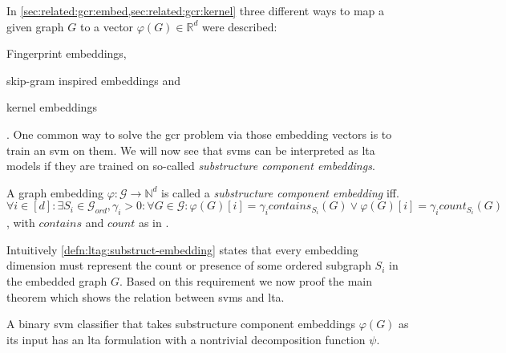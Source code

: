 In \cref{sec:related:gcr:embed,sec:related:gcr:kernel} three different ways to map a given graph $G$ to a vector $\varphi(G) \in \mathbb{R}^d$ were described:
\begin{enumerate*}
	\item Fingerprint embeddings,
	\item skip-gram inspired embeddings and
	\item kernel embeddings
\end{enumerate*}.
One common way to solve the \ac{gcr} problem via those embedding vectors is to train an \ac{svm} on them.
We will now see that \acp{svm} can be interpreted as \ac{lta} models if they are trained on so-called \textit{substructure component embeddings}.
\begin{defn}\label{defn:ltag:substruct-embedding}
	A graph embedding $\varphi: \mathcal{G} \to \mathbb{N}^{d}$ is called a \textit{substructure component embedding} iff.\ %
	$\forall i \in [d]: \exists S_i \in \mathcal{G}_{\mathit{ord}}, \gamma_i > 0: \forall G \in \mathcal{G}: {{\varphi(G)}[i] = \gamma_i \mathit{contains}_{S_i}(G)} \lor {{\varphi(G)}[i] = \gamma_i \mathit{count}_{S_i}(G)}$,
	with $\mathit{contains}$ and $\mathit{count}$ as in .
\end{defn}
Intuitively \cref{defn:ltag:substruct-embedding} states that every embedding dimension must represent the count or presence of some ordered subgraph $S_i$ in the embedded graph $G$.
Based on this requirement we now proof the main theorem which shows the relation between \acp{svm} and \ac{lta}.
\begin{thm}\label{thm:ltag:svm-ltag-formulation}
	A binary \ac{svm} classifier that takes substructure component embeddings $\varphi(G)$ as its input has an \ac{lta} formulation with a nontrivial decomposition function $\psi$.
\end{thm}
